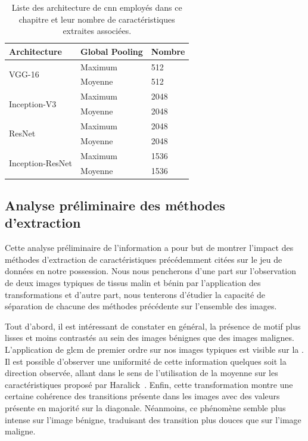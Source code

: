 \begin{table}[H]
    \centering
    \begin{tabular*}{0.6\linewidth}{l@{\extracolsep{\fill}}ll}
    \toprule
    \textbf{Architecture}               & Global Pooling   & \textbf{Nombre}    \\ \hline
    \multirow{2}{*}{VGG-16}             & Maximum          & 512                \\ \cline{2-3}
                                        & Moyenne          & 512                \\ \hline
    \multirow{2}{*}{Inception-V3}       & Maximum          & 2048               \\ \cline{2-3}
                                        & Moyenne          & 2048               \\ \hline
    \multirow{2}{*}{ResNet}             & Maximum          & 2048               \\ \cline{2-3}
                                        & Moyenne          & 2048               \\ \hline
    \multirow{2}{*}{Inception-ResNet}   & Maximum          & 1536               \\ \cline{2-3}
                                        & Moyenne          & 1536               \\
    \bottomrule
    \end{tabular*}
    \caption{Liste des architecture de \gls{cnn} employés dans ce chapitre et leur nombre de caractéristiques extraites associées.}
    \label{tab:number_features_transferlearning}
\end{table}\par

\subsection{Analyse préliminaire des méthodes d'extraction}
Cette analyse préliminaire de l'information a pour but de montrer l'impact des méthodes d'extraction de caractéristiques précédemment citées sur le jeu de données en notre possession. Nous nous pencherons d'une part sur l'observation de deux images typiques de tissus malin et bénin par l'application des transformations et d'autre part, nous tenterons d'étudier la capacité de séparation de chacune des méthodes précédente sur l'ensemble des images.\par

Tout d'abord, il est intéressant de constater en général, la présence de motif plus lisses et moins contrastés au sein des images bénignes que des images malignes. L'application de \gls{glcm} de premier ordre sur nos images typiques est visible sur la . Il est possible d'observer une uniformité de cette information quelques soit la direction observée, allant dans le sens de l'utilisation de la moyenne sur les caractéristiques proposé par Haralick~\cite{Wiltgen2008}. Enfin, cette transformation montre une certaine cohérence des transitions présente dans les images avec des valeurs présente en majorité sur la diagonale. Néanmoins, ce phénomène semble plus intense sur l'image bénigne, traduisant des transition plus douces que sur l'image maligne.\par

